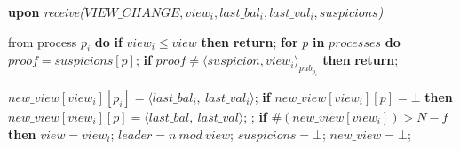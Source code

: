 \begin{algorithm}
\begin{algorithmic}[1]
		\State\textbf{upon} \textit{receive($VIEW\_CHANGE, view_i, last\_bal_i, last\_val_i, suspicions$)} 
		\item[] from process $p_i$ \textbf{do} 
		\State \hspace{\algorithmicindent} \textbf{if} $view_i \leq view$ \textbf{then}
		\State \hspace{\algorithmicindent}\hspace{\algorithmicindent}\textbf{return};
		\State
		\State \hspace{\algorithmicindent} \textbf{for} $p$ \textbf{in} $processes$ \textbf{do} 
		\State \hspace{\algorithmicindent}\hspace{\algorithmicindent} $proof = suspicions[p]$;
		\State \hspace{\algorithmicindent}\hspace{\algorithmicindent} \textbf{if} $proof \neq \langle suspicion, view_i \rangle_{pub_{p_i}}$ \textbf{then}
		\State \hspace{\algorithmicindent}\hspace{\algorithmicindent}\hspace{\algorithmicindent} \textbf{return};
		
		\State
		\State\hspace{\algorithmicindent} $new\_view[view_i][p_i] = \langle last\_bal_i,\ last\_val_i \rangle$;
		\State\hspace{\algorithmicindent} \textbf{if} $new\_view[view_i][p] = \bot$ \textbf{then}
		\State\hspace{\algorithmicindent}\hspace{\algorithmicindent} $new\_view[view_i][p] = \langle last\_bal,\ last\_val \rangle$;
		\State\hspace{\algorithmicindent}\hspace{\algorithmicindent}  ;
		\State
		\State\hspace{\algorithmicindent} \textbf{if} $\#(new\_view[view_i]) > N-f$ \textbf{then}
		\State\hspace{\algorithmicindent}\hspace{\algorithmicindent} $view = view_i$;
		\State\hspace{\algorithmicindent}\hspace{\algorithmicindent} $leader = n\ mod\ view$;
		\State\hspace{\algorithmicindent}\hspace{\algorithmicindent} $suspicions = \bot$;
		\State\hspace{\algorithmicindent}\hspace{\algorithmicindent} $new\_view = \bot$;


\end{algorithmic}
\end{algorithm}
